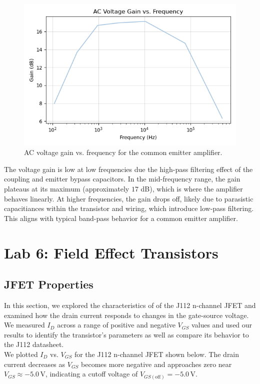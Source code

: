 \documentclass{article}
\begin{document}
\begin{figure}[H]
    \centering
    \includegraphics[width=0.7\linewidth]{5.4a.png}
    \caption{AC voltage gain vs. frequency for the common emitter amplifier.}
    \label{fig:gain_plot}
\end{figure}

\noindent The voltage gain is low at low frequencies due the high-pass filtering effect
of the coupling and emitter bypass capacitors. In the mid-frequency range, the 
gain plateaus at its maximum (approximately $17$ dB), which is where the
amplifier behaves linearly. At higher frequencies, the gain drops off, likely
due to parasistic capacitiances within the transistor and wiring, which introduce
low-pass filtering. This aligns with typical band-pass behavior for a common
emitter amplifier.



\section{Lab 6: Field Effect Transistors}

\subsection{JFET Properties}

In this section, we explored the characteristics of of the J112 n-channel JFET
and examined how the drain current responds to changes in the gate-source voltage.
We measured $I_D$ across a range of positive and negative $V_{GS}$ values and
used our results to identify the transistor's parameters as well as compare its
behavior to the J112 datasheet.\\

\noindent We plotted $I_D$ vs. $V_{GS}$ for the J112 n-channel JFET shown below.
The drain current decreases as $V_{GS}$ becomes more negative and approaches zero near 
$V_{GS} \approx -5.0\,\si{\volt}$, indicating a cutoff voltage of 
$V_{GS(\text{off})} = -5.0\,\si{\volt}$.
\end{document}
